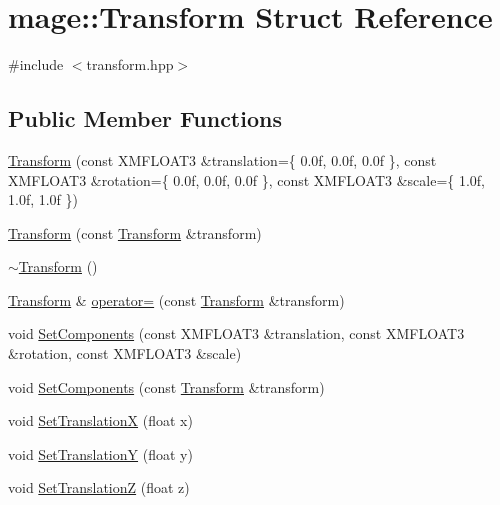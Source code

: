\hypertarget{structmage_1_1_transform}{}\section{mage\+:\+:Transform Struct Reference}
\label{structmage_1_1_transform}


{\ttfamily \#include $<$transform.\+hpp$>$}

\subsection*{Public Member Functions}
\begin{DoxyCompactItemize}
\item 
\hyperlink{structmage_1_1_transform_a3d324dc935e11ee5e82957d58553fd7d}{Transform} (const X\+M\+F\+L\+O\+A\+T3 \&translation=\{ 0.\+0f, 0.\+0f, 0.\+0f \}, const X\+M\+F\+L\+O\+A\+T3 \&rotation=\{ 0.\+0f, 0.\+0f, 0.\+0f \}, const X\+M\+F\+L\+O\+A\+T3 \&scale=\{ 1.\+0f, 1.\+0f, 1.\+0f \})
\item 
\hyperlink{structmage_1_1_transform_a6cf7a754eff6ffe6f99f8942468d49bc}{Transform} (const \hyperlink{structmage_1_1_transform}{Transform} \&transform)
\item 
\hyperlink{structmage_1_1_transform_a3380713ee853d112c140e8688c0f73b5}{$\sim$\+Transform} ()
\item 
\hyperlink{structmage_1_1_transform}{Transform} \& \hyperlink{structmage_1_1_transform_a40bc8c32b09dc419d0573fffcd938644}{operator=} (const \hyperlink{structmage_1_1_transform}{Transform} \&transform)
\item 
void \hyperlink{structmage_1_1_transform_aba5311db1360a15aea4de33a060ab27e}{Set\+Components} (const X\+M\+F\+L\+O\+A\+T3 \&translation, const X\+M\+F\+L\+O\+A\+T3 \&rotation, const X\+M\+F\+L\+O\+A\+T3 \&scale)
\item 
void \hyperlink{structmage_1_1_transform_a734e5efbc285bde2c4252693a9304421}{Set\+Components} (const \hyperlink{structmage_1_1_transform}{Transform} \&transform)
\item 
void \hyperlink{structmage_1_1_transform_a003d84bc07835f17e8598dceda06d973}{Set\+TranslationX} (float x)
\item 
void \hyperlink{structmage_1_1_transform_ab2c63fbbe2dd2c40d841f8c37df24394}{Set\+TranslationY} (float y)
\item 
void \hyperlink{structmage_1_1_transform_aba982207d2d2d20cae2ba9d8496e8531}{Set\+TranslationZ} (float z)
\item 

\end{DoxyCompactItemize}
